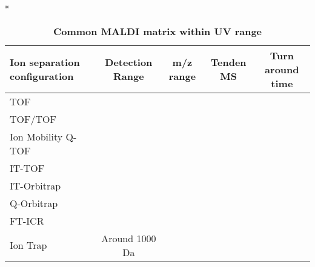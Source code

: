 \begin{table}{*}
\caption{\textbf{Common MALDI matrix within UV range}}
\label{tab:matrix}

\centering 
\scriptsize

\begin{tabular}{|l|c|c|c|c|}
    \hline 
    \textbf{Ion separation configuration} & \textbf{Detection Range} & \textbf{m/z range} & \textbf{Tenden MS} & \textbf{Turn around time} \\ 
    \hline
    TOF & \\
    TOF/TOF \\
    Ion Mobility Q-TOF & \\
    IT-TOF \\
    IT-Orbitrap \\
    Q-Orbitrap \\
    FT-ICR & \\
    Ion Trap & Around 1000 Da \\
    \hline \hline 
\end{tabular}
\end{table}